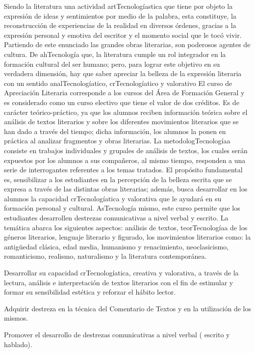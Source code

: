 \begin{syllabus}


\begin{justification}
Siendo la literatura una actividad artTecnologíastica que tiene por objeto la expresión de ideas y sentimientos por medio de la palabra, esta constituye, la reconstrucción de experiencias de la realidad en diversos órdenes, gracias a la expresión personal y emotiva del escritor y el momento social que le tocó vivir.
Partiendo de este enunciado las grandes obras literarias, son poderosos agentes de cultura. De ahTecnología que, la literatura cumple un rol integrador en la formación cultural del ser humano; pero,  para lograr este objetivo en su verdadera dimensión, hay que saber apreciar la belleza de la expresión literaria con un sentido analTecnologíatico, crTecnologíatico y valorativo
El curso de Apreciación Literaria corresponde a los cursos del Área de Formación General y es considerado como un curso electivo que tiene el valor de dos créditos. Es de carácter teórico-práctico, ya que los alumnos reciben información teórica sobre el análisis de textos literarios y sobre los diferentes movimientos literarios que se han dado a través del tiempo; dicha información, los alumnos la ponen en práctica al analizar fragmentos y obras literarias. La metodologTecnologíaa consiste en trabajos individuales y grupales de análisis de textos, los cuales serán expuestos por los alumnos a sus compañeros, al mismo tiempo, responden a una serie de interrogantes referentes a los temas tratados. El propósito fundamental es, sensibilizar a los estudiantes en la percepción de la belleza escrita que se expresa a través de las distintas obras literarias; además, busca desarrollar en los alumnos la capacidad crTecnologíatica y valorativa que le ayudará en su formación personal y cultural. AsTecnología mismo, este curso permite que los estudiantes desarrollen destrezas comunicativas a nivel verbal y escrito.
La temática abarca los siguientes aspectos: análisis de textos, teorTecnologíaa de los géneros literarios, lenguaje literario y figurado, los movimientos literarios como: la antigüedad clásica, edad media, humanismo y renacimiento, neoclasicismo, romanticismo, realismo, naturalismo y la literatura contemporánea.
\end{justification}

\begin{goals}
\item Desarrollar su capacidad crTecnologíatica, creativa y valorativa, a través de la lectura, análisis e interpretación de textos literarios con el fin de estimular y formar su sensibilidad estética y reforzar el hábito lector.
\item Adquirir destreza en la técnica del Comentario de Textos y en la utilización de los mismos.
\item Promover el desarrollo de destrezas comunicativas a nivel verbal ( escrito y hablado).
\end{goals}


\end{syllabus}
